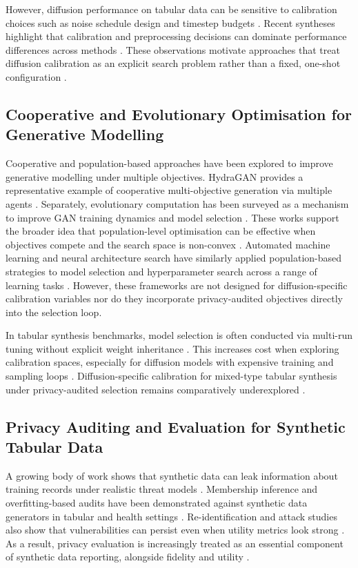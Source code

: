 \documentclass[preprint,12pt]{elsarticle}
\begin{document}
However, diffusion performance on tabular data can be sensitive to calibration choices such as noise schedule design and timestep budgets \cite{karras2022edm_neurips}. Recent syntheses highlight that calibration and preprocessing decisions can dominate performance differences across methods \cite{VillaizanVallelado2025}. These observations motivate approaches that treat diffusion calibration as an explicit search problem rather than a fixed, one-shot configuration \cite{Kotelnikov2023}.

\subsection{Cooperative and Evolutionary Optimisation for Generative Modelling}\label{sec:rw_multiagent}
Cooperative and population-based approaches have been explored to improve generative modelling under multiple objectives. HydraGAN provides a representative example of cooperative multi-objective generation via multiple agents \cite{DeSmetCook2024}. Separately, evolutionary computation has been surveyed as a mechanism to improve GAN training dynamics and model selection \cite{Wang2024EvolutionaryGAN}. 
These works support the broader idea that population-level optimisation can be effective 
when objectives compete and the search space is non-convex \cite{Back1996,Hansen2001}. 
Automated machine learning and neural architecture search have similarly applied 
population-based strategies to model selection and hyperparameter search across 
a range of learning tasks \cite{He2021AutoML}. However, these frameworks are not 
designed for diffusion-specific calibration variables nor do they incorporate 
privacy-audited objectives directly into the selection loop.

In tabular synthesis benchmarks, model selection is often conducted via multi-run tuning without explicit weight inheritance \cite{Restrepo2025}. This increases cost when exploring calibration spaces, especially for diffusion models with expensive training and sampling loops \cite{VillaizanVallelado2025}. Diffusion-specific calibration for mixed-type tabular synthesis under privacy-audited selection remains comparatively underexplored \cite{Hernandez2025}.

\subsection{Privacy Auditing and Evaluation for Synthetic Tabular Data}\label{sec:rw_privacy}
A growing body of work shows that synthetic data can leak information about training records under realistic threat models \cite{ZhangMalin2022}. Membership inference and overfitting-based audits have been demonstrated against synthetic data generators in tabular and health settings \cite{vanbreugel2023domias_aistats}. Re-identification and attack studies also show that vulnerabilities can persist even when utility metrics look strong \cite{Alshantti2025}. As a result, privacy evaluation is increasingly treated as an essential component of synthetic data reporting, alongside fidelity and utility \cite{lautrup2025syntheval}.
\end{document}
